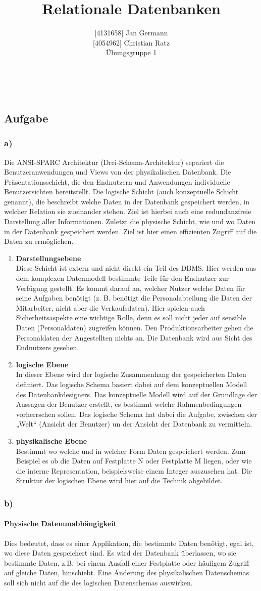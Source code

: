 \documentclass[11pt,a4paper,DIV=9]{scrartcl}
\author{{[}4131658{]} Jan Germann \\{[}4054962{]} Christian Ratz\\Übungsgruppe 1}
\title{Relationale Datenbanken}
\newcounter{temp}
\newcommand{\aufgabe}[1]{
  \setcounter{temp}{\value{subsection}}
  \setcounter{subsection}{#1}
  \addtocounter{subsection}{-1}
  \subsection{Aufgabe}
  \setcounter{subsection}{\value{temp}}
}
\newcommand{\teil}[2][]{
  \subsubsection*{#2) #1}
}
\renewcommand{\author}[1]{\renewcommand{\author}{#1}}
\renewcommand{\title}[1]{\renewcommand{\title}{#1}}
\newcommand{\makehomeworktitle}{
  \begin{minipage}[t]{6.5cm}
    \sf{\author}
  \end{minipage}
  \begin{minipage}[t]{6.5cm}
    \begin{flushright}
      \sf{\title\\\today}
    \end{flushright}
  \end{minipage}
  \\[0.2cm]
  \begin{center}
    \sf{
      \color{blue}{
        \LARGE{Aufgabenblatt \blattnr}
      }
    }
  \end{center}
  \vspace{0.1cm}
}
\begin{document}
\makehomeworktitle

\aufgabe{1}
\teil{a}
  Die ANSI-SPARC Architektur (Drei-Schema-Architektur) separiert die Benutzeranwendungen und Views von der physikalischen Datenbank. Die Präsentationsschicht, die den Endnutzern und Anwendungen individuelle Benutzersichten bereitstellt. Die logische Schicht (auch konzeptuelle Schicht genannt), die beschreibt welche Daten in der Datenbank gespeichert werden, in welcher Relation sie zueinander stehen. Ziel ist hierbei auch eine redundanzfreie Darstellung aller Informationen. Zuletzt die physische Schicht, wie und wo Daten in der Datenbank gespeichert werden. Ziel ist hier einen effizienten Zugriff auf die Daten zu ermöglichen.
  \begin{enumerate}
    \item \textbf{Darstellungsebene} \\
      Diese Schicht ist extern und nicht direkt ein Teil des DBMS. Hier werden aus dem komplexen Datenmodell bestimmte Teile für den Endnutzer zur Verfügung gestellt. Es kommt darauf an, welcher Nutzer welche Daten für seine Aufgaben benötigt (z. B. benötigt die Personalabteilung die Daten der Mitarbeiter, nicht aber die Verkaufsdaten). Hier spielen auch Sicherheitsaspekte eine wichtige Rolle, denn es soll nicht jeder auf sensible Daten (Personaldaten) zugreifen können. Den Produktionsarbeiter gehen die Personaldaten der Angestellten nichts an. Die Datenbank wird aus Sicht des Endnutzers gesehen.

    \item \textbf{logische Ebene} \\
      In dieser Ebene wird der logische Zusammenhang der gespeicherten Daten definiert. Das logische Schema basiert dabei auf dem konzeptuellen Modell des Datenbankdesigners. Das konzeptuelle Modell wird auf der Grundlage der Aussagen der Benutzer erstellt, es bestimmt welche Rahmenbedingungen vorherrschen sollen. Das logische Schema hat dabei die Aufgabe, zwischen der „Welt“ (Ansicht der Benutzer) un der Ansicht der Datenbank zu vermitteln.
    \item \textbf{physikalische Ebene} \\
      Bestimmt wo welche und in welcher Form Daten gespeichert werden. Zum Beispiel es ob die Daten auf Festplatte N oder Festplatte M liegen, oder wie die interne Representation, beispielsweise einem Integer auszusehen hat. Die Struktur der logischen Ebene wird hier auf die Technik abgebildet.
    \end{enumerate}
\teil{b}
  \paragraph{Physische Datenunabhängigkeit} %
  \label{par:physische_datenunabh_ngigkeit}
    Dies bedeutet, dass es einer Applikation, die bestimmte Daten benötigt, egal ist, wo diese Daten gespeichert sind. Es wird der Datenbank überlassen, wo sie bestimmte Daten, z.B. bei einem Ausfall einer Festplatte oder häufigem Zugriff auf gleiche Daten, hinschiebt. Eine Änderung des physikalischen Datenschemas soll sich nicht auf die des logischen Datenschemas auswirken.
\end{document}
